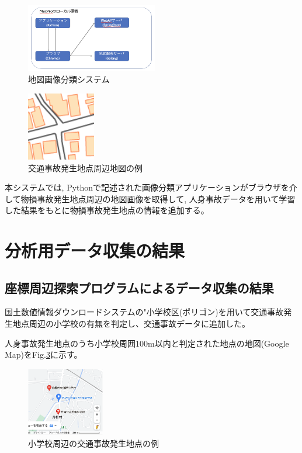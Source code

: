 \documentclass[a4j,8.5pt, twocolumn,fleqn]{jbook}
\begin{document}
\begin{figure}[htb]
    \centering
    \includegraphics[height=30mm]{images/mapclassification_server.png}
    \vspace{-3mm}
    \caption{地図画像分類システム}
    \label{classifications}
\end{figure}

\begin{figure}[htb]
    \centering
    \includegraphics[height=30mm]{images/tiriixn.png}
    \vspace{-3mm}
    \caption{交通事故発生地点周辺地図の例}
    \label{tiriixn}
\end{figure}

本システムでは, Pythonで記述された画像分類アプリケーションがブラウザを介して物損事故発生地点周辺の地図画像を取得して, 人身事故データを用いて学習した結果をもとに物損事故発生地点の情報を追加する。

\section{分析用データ収集の結果}
\subsection{座標周辺探索プログラムによるデータ収集の結果}
国土数値情報ダウンロードシステムの"小学校区(ポリゴン)を用いて交通事故発生地点周辺の小学校の有無を判定し、交通事故データに追加した。

人身事故発生地点のうち小学校周囲100m以内と判定された地点の地図(Google Map)をFig.\ref{shougakkou_gmap}に示す。

\begin{figure}[htb]
    \centering
    \includegraphics[height=30mm]{images/shougakkou_gmap.png}
    \vspace{-3mm}
    \caption{小学校周辺の交通事故発生地点の例}
    \label{shougakkou_gmap}
\end{figure}
\end{document}
